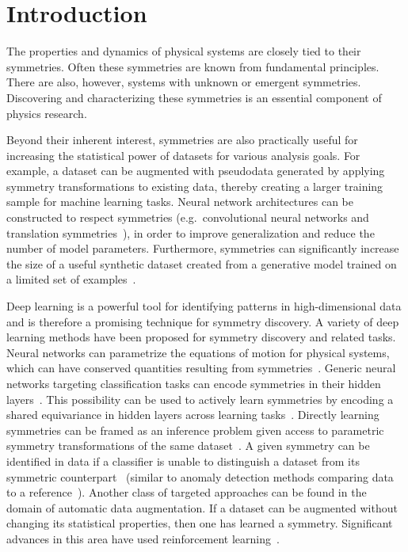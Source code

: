 \documentclass[aps,prx,reprint,preprintnumbers,superscriptaddress,nofootinbib,longbibliography,floatfix]{revtex4-1}
\begin{document}
\section{Introduction}
\label{sec:intro}

The properties and dynamics of physical systems are closely tied to their symmetries.
%
Often these symmetries are known from fundamental principles. There are also, however, systems with unknown or emergent symmetries.
%
Discovering and characterizing these symmetries is an essential component of physics research.


Beyond their inherent interest, symmetries are also practically useful for increasing the statistical power of datasets for various analysis goals.
%
For example, a dataset can be augmented with pseudodata generated by applying symmetry transformations to existing data, thereby creating a larger training sample for machine learning tasks.
%
Neural network architectures can be constructed to respect symmetries (e.g.~convolutional neural networks and translation symmetries~\cite{6795724}), in order to improve generalization and reduce the number of model parameters.
%
Furthermore, symmetries can significantly increase the size of a useful synthetic dataset created from a generative model trained on a limited set of examples~\cite{2008.06545,Dillon:2021gag}.


Deep learning is a powerful tool for identifying patterns in high-dimensional data and is therefore a promising technique for symmetry discovery.
%
A variety of deep learning methods have been proposed for symmetry discovery and related tasks.
%
Neural networks can parametrize the equations of motion for physical systems, which can have conserved quantities resulting from symmetries~\cite{greydanus2019hamiltonian,cranmer2020lagrangian}.
%
Generic neural networks targeting classification tasks can encode symmetries in their hidden layers~\cite{Barenboim:2021vzh,Krippendorf:2020gny}. %
This possibility can be used to actively learn symmetries by encoding a shared equivariance in hidden layers across learning tasks~\cite{zhou2021metalearning}.
%
Directly learning symmetries can be framed as an inference problem given access to parametric symmetry transformations of the same dataset~\cite{benton2020learning}.
%
A given symmetry can be identified in data if a classifier is unable to distinguish a dataset from its symmetric counterpart~\cite{Tombs:2021wae,Lester:2021kur,Lester:2021aks} (similar to anomaly detection methods comparing data to a reference~\cite{Collins:2018epr,Collins:2019jip,DAgnolo:2018cun}).
%
Another class of targeted approaches can be found in the domain of automatic data augmentation.
%
If a dataset can be augmented without changing its statistical properties, then one has learned a symmetry. Significant advances in this area have used reinforcement learning~\cite{cubuk2019autoaugment,lim2019fast}. 
\end{document}
